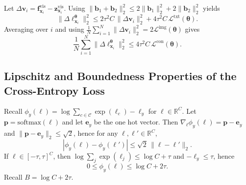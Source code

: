 \documentclass{article}
\theoremstyle{plain}
\theoremstyle{definition}
\theoremstyle{remark}
\begin{document}
	Let $\Delta\mathbf{v}_i=\mathbf{f}^{\mathrm{vis}}_{\mathbf{x}_i}-\mathbf{z}^{\mathrm{vis}}_{\mathbf{x}_i}$.
	Using $\|\mathbf{b}_1+\mathbf{b}_2\|_2^2\le 2\|\mathbf{b}_1\|_2^2+2\|\mathbf{b}_2\|_2^2$ yields
	\begin{equation*}
		\|\Delta\boldsymbol{\ell}^{\boldsymbol{\theta}}_{\mathbf{x}_i}\|_2^2
		\le
		2\tau^2 C\,\|\Delta\mathbf{v}_i\|_2^2
		+
		4\tau^2 C\,\mathcal L^{\mathrm{txt}}(\boldsymbol{\theta}).
	\end{equation*}
	Averaging over $i$ and using $\frac{1}{N}\sum_{i=1}^N\|\Delta\mathbf{v}_i\|_2^2=2\mathcal L^{\mathrm{img}}(\boldsymbol{\theta})$ gives
	\begin{equation*}
		\frac{1}{N}\sum_{i=1}^N\|\Delta\boldsymbol{\ell}^{\boldsymbol{\theta}}_{\mathbf{x}_i}\|_2^2
		\le
		4\tau^2 C\,\mathcal L^{\mathrm{con}}(\boldsymbol{\theta}).
	\end{equation*}
	\subsection{Lipschitz and Boundedness Properties of the Cross-Entropy Loss}
	Recall $\phi_y(\boldsymbol{\ell})=\log\sum_{c\in \mathcal{C}}\exp(\ell_c)-\ell_y$ for $\boldsymbol{\ell}\in\mathbb R^{C}$.
	Let $\mathbf{p}=\mathrm{softmax}(\boldsymbol{\ell})$ and let $\mathbf{e}_y$ be the one hot vector.
	Then $\nabla_{\boldsymbol{\ell}}\phi_y(\boldsymbol{\ell})=\mathbf{p}-\mathbf{e}_y$ and $\|\mathbf{p}-\mathbf{e}_y\|_2\le\sqrt2$, hence for any $\boldsymbol{\ell},\boldsymbol{\ell}'\in\mathbb R^{C}$,
	\begin{equation*}
		|\phi_y(\boldsymbol{\ell})-\phi_y(\boldsymbol{\ell}')|
		\le
		\sqrt2\,\|\boldsymbol{\ell}-\boldsymbol{\ell}'\|_2.
	\end{equation*}
	If $\boldsymbol{\ell}\in[-\tau,\tau]^{C}$, then $\log\sum_{j}\exp(\ell_j)\le \log C+\tau$ and $-\ell_y\le\tau$, hence
	\begin{equation*}
		0\le \phi_y(\boldsymbol{\ell})\le \log C+2\tau.
	\end{equation*}
	Recall $B=\log C+2\tau$.
\end{document}

